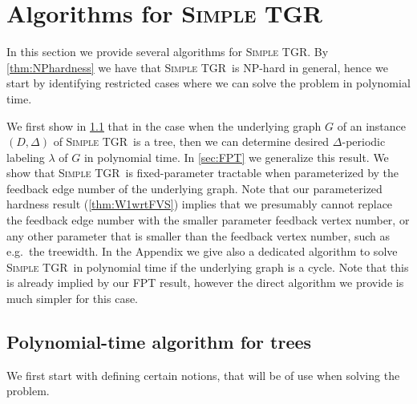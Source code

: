 \documentclass[a4paper,UKenglish,cleveref, autoref, thm-restate,anonymous]{lipics-v2021}
\newcommand{\deltaExact}{\textsc{Simple TGR}}
\begin{document}
\section{Algorithms for \deltaExact}
In this section we provide several algorithms for \deltaExact. By \cref{thm:NPhardness} we have that \deltaExact\ is NP-hard in general, hence we start by identifying restricted cases where we can solve the problem in polynomial time.


We first show in \cref{sec:treealgo} that in the case when the underlying graph $G$ of an instance $(D, \Delta)$ of \deltaExact\ is a tree, then we can determine desired $\Delta$-periodic labeling $\lambda$ of $G$ in polynomial time. In \cref{sec:FPT} we generalize this result. We show that \deltaExact\ is fixed-parameter tractable when parameterized by the feedback edge number of the underlying graph. Note that our parameterized hardness result (\cref{thm:W1wrtFVS}) implies that we presumably cannot replace the feedback edge number with the smaller parameter feedback vertex number, or any other parameter that is smaller than the feedback vertex number, such as e.g.\ the treewidth.
In the Appendix we give also a dedicated algorithm to solve \deltaExact\ in polynomial time if the underlying graph is a cycle. Note that this is already implied by our FPT result, however the direct algorithm we provide is much simpler for this case.


\subsection{Polynomial-time algorithm for trees}\label{sec:treealgo}
We first start with defining certain notions, that will be of use when solving the problem.
\end{document}
